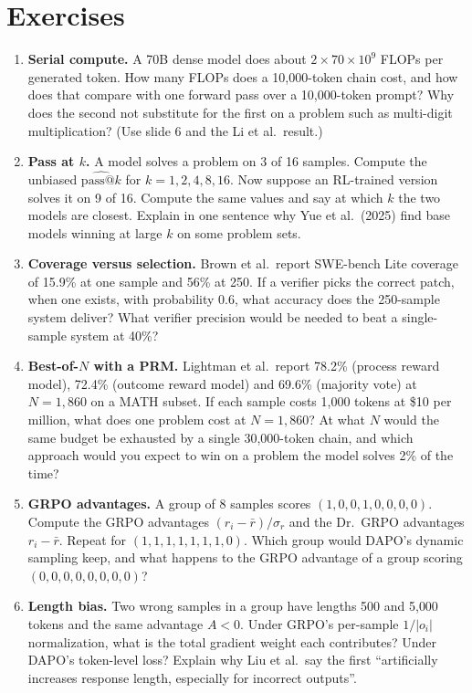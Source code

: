 \documentclass[11pt,letterpaper]{article}
\begin{document}
\clearpage
\section{Exercises}

\begin{enumerate}[leftmargin=1.6em,itemsep=6pt]
\item \textbf{Serial compute.} A 70B dense model does about $2\times70\times10^9$ FLOPs per generated token. How many FLOPs does a 10{,}000-token chain cost, and how does that compare with one forward pass over a 10{,}000-token prompt? Why does the second not substitute for the first on a problem such as multi-digit multiplication? (Use slide 6 and the Li et al.\ result.)
\item \textbf{Pass at $k$.} A model solves a problem on 3 of 16 samples. Compute the unbiased $\widehat{\mathrm{pass}@k}$ for $k=1,2,4,8,16$. Now suppose an RL-trained version solves it on 9 of 16. Compute the same values and say at which $k$ the two models are closest. Explain in one sentence why Yue et al.\ (2025) find base models winning at large $k$ on some problem sets.
\item \textbf{Coverage versus selection.} Brown et al.\ report SWE-bench Lite coverage of 15.9\% at one sample and 56\% at 250. If a verifier picks the correct patch, when one exists, with probability 0.6, what accuracy does the 250-sample system deliver? What verifier precision would be needed to beat a single-sample system at 40\%?
\item \textbf{Best-of-$N$ with a PRM.} Lightman et al.\ report 78.2\% (process reward model), 72.4\% (outcome reward model) and 69.6\% (majority vote) at $N=1{,}860$ on a MATH subset. If each sample costs 1{,}000 tokens at \$10 per million, what does one problem cost at $N=1{,}860$? At what $N$ would the same budget be exhausted by a single 30{,}000-token chain, and which approach would you expect to win on a problem the model solves 2\% of the time?
\item \textbf{GRPO advantages.} A group of 8 samples scores $(1,0,0,1,0,0,0,0)$. Compute the GRPO advantages $(r_i-\bar r)/\sigma_r$ and the Dr.\ GRPO advantages $r_i-\bar r$. Repeat for $(1,1,1,1,1,1,1,0)$. Which group would DAPO's dynamic sampling keep, and what happens to the GRPO advantage of a group scoring $(0,0,0,0,0,0,0,0)$?
\item \textbf{Length bias.} Two wrong samples in a group have lengths 500 and 5{,}000 tokens and the same advantage $A<0$. Under GRPO's per-sample $1/|o_i|$ normalization, what is the total gradient weight each contributes? Under DAPO's token-level loss? Explain why Liu et al.\ say the first ``artificially increases response length, especially for incorrect outputs''.

\end{enumerate}
\end{document}
